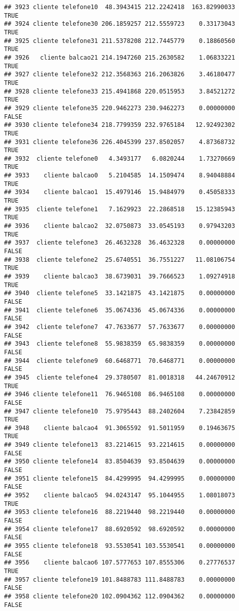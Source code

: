 \documentclass[
]{article}
\begin{document}
\begin{verbatim}
## 3923 cliente telefone10  48.3943415 212.2242418  163.82990033     TRUE
## 3924 cliente telefone30 206.1859257 212.5559723    0.33173043     TRUE
## 3925 cliente telefone31 211.5378208 212.7445779    0.18860560     TRUE
## 3926   cliente balcao21 214.1947260 215.2630582    1.06833221     TRUE
## 3927 cliente telefone32 212.3568363 216.2063826    3.46180477     TRUE
## 3928 cliente telefone33 215.4941868 220.0515953    3.84521272     TRUE
## 3929 cliente telefone35 220.9462273 230.9462273    0.00000000    FALSE
## 3930 cliente telefone34 218.7799359 232.9765184   12.92492302     TRUE
## 3931 cliente telefone36 226.4045399 237.8502057    4.87368732     TRUE
## 3932  cliente telefone0   4.3493177   6.0820244    1.73270669     TRUE
## 3933    cliente balcao0   5.2104585  14.1509474    8.94048884     TRUE
## 3934    cliente balcao1  15.4979146  15.9484979    0.45058333     TRUE
## 3935  cliente telefone1   7.1629923  22.2868518   15.12385943     TRUE
## 3936    cliente balcao2  32.0750873  33.0545193    0.97943203     TRUE
## 3937  cliente telefone3  26.4632328  36.4632328    0.00000000    FALSE
## 3938  cliente telefone2  25.6740551  36.7551227   11.08106754     TRUE
## 3939    cliente balcao3  38.6739031  39.7666523    1.09274918     TRUE
## 3940  cliente telefone5  33.1421875  43.1421875    0.00000000    FALSE
## 3941  cliente telefone6  35.0674336  45.0674336    0.00000000    FALSE
## 3942  cliente telefone7  47.7633677  57.7633677    0.00000000    FALSE
## 3943  cliente telefone8  55.9838359  65.9838359    0.00000000    FALSE
## 3944  cliente telefone9  60.6468771  70.6468771    0.00000000    FALSE
## 3945  cliente telefone4  29.3780507  81.0018318   44.24670912     TRUE
## 3946 cliente telefone11  76.9465108  86.9465108    0.00000000    FALSE
## 3947 cliente telefone10  75.9795443  88.2402604    7.23842859     TRUE
## 3948    cliente balcao4  91.3065592  91.5011959    0.19463675     TRUE
## 3949 cliente telefone13  83.2214615  93.2214615    0.00000000    FALSE
## 3950 cliente telefone14  83.8504639  93.8504639    0.00000000    FALSE
## 3951 cliente telefone15  84.4299995  94.4299995    0.00000000    FALSE
## 3952    cliente balcao5  94.0243147  95.1044955    1.08018073     TRUE
## 3953 cliente telefone16  88.2219440  98.2219440    0.00000000    FALSE
## 3954 cliente telefone17  88.6920592  98.6920592    0.00000000    FALSE
## 3955 cliente telefone18  93.5530541 103.5530541    0.00000000    FALSE
## 3956    cliente balcao6 107.5777653 107.8555306    0.27776537     TRUE
## 3957 cliente telefone19 101.8488783 111.8488783    0.00000000    FALSE
## 3958 cliente telefone20 102.0904362 112.0904362    0.00000000    FALSE

\end{verbatim}
\end{document}
